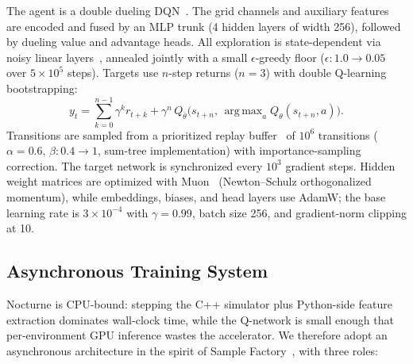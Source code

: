 \documentclass{article}
\DeclareMathOperator*{\argmax}{arg\,max}
\begin{document}
The agent is a double dueling DQN~\citep{van2016deep, wang2016dueling}. The
grid channels and auxiliary features are encoded and fused by an MLP trunk
(4 hidden layers of width 256), followed by dueling value and advantage
heads. All exploration is state-dependent via noisy linear
layers~\citep{fortunato2017noisy}, annealed jointly with a small
$\epsilon$-greedy floor ($\epsilon: 1.0 \to 0.05$ over $5 \times 10^5$
steps). Targets use $n$-step returns ($n = 3$) with double Q-learning
bootstrapping:
\begin{equation}
  y_t = \sum_{k=0}^{n-1} \gamma^k r_{t+k}
  + \gamma^n \, Q_{\bar\theta}\!\big(s_{t+n},\,
    \argmax_{a} Q_\theta(s_{t+n}, a)\big).
\end{equation}
Transitions are sampled from a prioritized replay
buffer~\citep{schaul2015prioritized} of $10^6$ transitions ($\alpha = 0.6$,
$\beta: 0.4 \to 1$, sum-tree implementation) with importance-sampling
correction. The target network is synchronized every $10^3$ gradient steps.
Hidden weight matrices are optimized with Muon~\citep{jordan2024muon}
(Newton--Schulz orthogonalized momentum), while embeddings, biases, and
head layers use AdamW; the base learning rate is $3 \times 10^{-4}$ with
$\gamma = 0.99$, batch size 256, and gradient-norm clipping at 10.

\subsection{Asynchronous Training System}
\label{sec:system}

Nocturne is CPU-bound: stepping the C++ simulator plus Python-side feature
extraction dominates wall-clock time, while the Q-network is small enough
that per-environment GPU inference wastes the accelerator. We therefore
adopt an asynchronous architecture in the spirit of Sample
Factory~\citep{petrenko2020sample}, with three roles:
\end{document}
